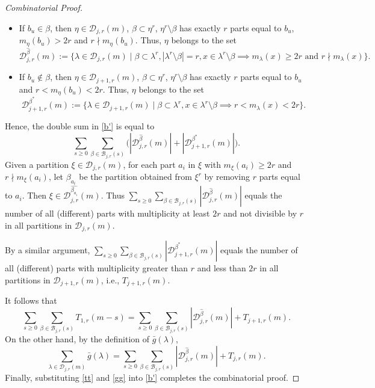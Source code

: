 \documentclass[reqno,12pt]{amsart}
\theoremstyle{definition}
\begin{document}
\begin{proof}[Combinatorial Proof]
\begin{itemize}
\item[(1)] If $b_u\in \beta$, then $\eta\in \mathcal D_{j,r}(m)$, $\beta\subset \eta^r$, $\eta^r\setminus \beta$ has exactly $r$ parts equal to $b_u$, $m_\eta(b_u)>2r$ and $r\nmid m_\eta(b_u)$.
Thus, $\eta$ belongs to the set  
$$\mathcal D^{\hat\beta}_{j,r}(m):=\{\lambda \in \mathcal D_{j,r}(m)\mid \beta \subset \lambda^r, |\lambda^r\setminus \beta|=r, x\in \lambda^r\setminus \beta \implies m_\lambda(x)\geq 2r \text{ and } r\nmid m_\lambda(x)\}.$$

\item[(2)] If $b_u\not\in \beta$, then $\eta\in \mathcal D_{j+1,r}(m)$, $\beta\subset \eta^r$, $\eta^r\setminus \beta$ has exactly $r$ parts equal to $b_u$  and $r<m_\eta(b_u)<2r$. Thus, $\eta$ belongs to the set
$$\mathcal D^{\beta^*}_{j+1,r}(m):=\{\lambda \in \mathcal D_{j+1,r}(m) \mid \beta \subset \lambda^r, x\in \lambda^r\setminus \beta \implies r<m_\lambda(x)<2r \}.$$

\end{itemize}

Hence, the double sum in \eqref{b'} is equal to
$$\sum_{s\geq 0}\sum_{\beta\in \mathcal B_{j,r}(s)}\Big(|\mathcal D^{\hat\beta}_{j,r}(m)|+|\mathcal D^{\beta^*}_{j+1,r}(m)|\Big).$$
Given a partition $\xi\in \mathcal D_{j,r}(m)$, for each part $a_i$ in $\xi$ with $m_\xi(a_i)\geq 2r$ and $r\nmid m_\xi(a_i)$, let $\beta_{a_i}$ be the partition obtained from $\xi^r$ by removing $r$ parts equal to $a_i$. Then $\xi\in \mathcal D^{\widehat{\beta_{a_i}}}_{j,r}(m)$. Thus $\sum_{s\geq 0}\sum_{\beta\in \mathcal B_{j,r}(s)}|\mathcal D^{\hat\beta}_{j,r}(m)|$ equals the number  of all (different) parts with multiplicity at least $2r$ and not divisible by $r$ in all partitions in $\mathcal D_{j,r}(m)$. 

By a similar argument, $\sum_{s\geq 0}\sum_{\beta\in \mathcal B_{j,r}(s)}|\mathcal D^{\beta^*}_{j+1,r}(m)|$ equals the number  of all (different) parts with multiplicity greater than $r$ and less than $2r$ in all partitions in $\mathcal D_{j+1,r}(m)$, i.e., $T_{j+1,r}(m)$.

It follows that
\begin{equation}\label{tt}
\sum_{s\geq 0}\sum_{\beta\in \mathcal B_{j,r}(s)}T_{1,r}(m-s)=\sum_{s\geq 0}\sum_{\beta\in \mathcal B_{j,r}(s)}|\mathcal D^{\hat\beta}_{j,r}(m)|+T_{j+1,r}(m).
\end{equation}
On the other hand, by the definition of $\bar g(\lambda)$, 
\begin{equation}\label{gg}
\sum_{\lambda\in \mathcal D_{j,r}(m)} \bar g(\lambda)=\sum_{s\geq 0}\sum_{\beta\in \mathcal B_{j,r}(s)}|\mathcal D^{\hat\beta}_{j,r}(m)|+T_{j,r}(m).
\end{equation}
Finally, substituting \eqref{tt} and \eqref{gg} into \eqref{b'} completes the combinatorial proof.
\end{proof}
\end{document}
